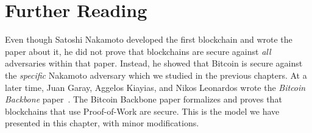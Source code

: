 \section{Further Reading}
Even though Satoshi Nakamoto developed the first blockchain and wrote the paper about it, he did
not prove that blockchains are secure against \emph{all} adversaries within that paper. Instead,
he showed that Bitcoin is secure against the \emph{specific} Nakamoto adversary which we studied
in the previous chapters. At a later time, Juan Garay, Aggelos Kiayias, and Nikos Leonardos
wrote the \emph{Bitcoin Backbone} paper~\cite{backbone}.
The Bitcoin Backbone paper formalizes and proves that blockchains that use Proof-of-Work
are secure. This is the model we have presented in this chapter, with minor modifications.

